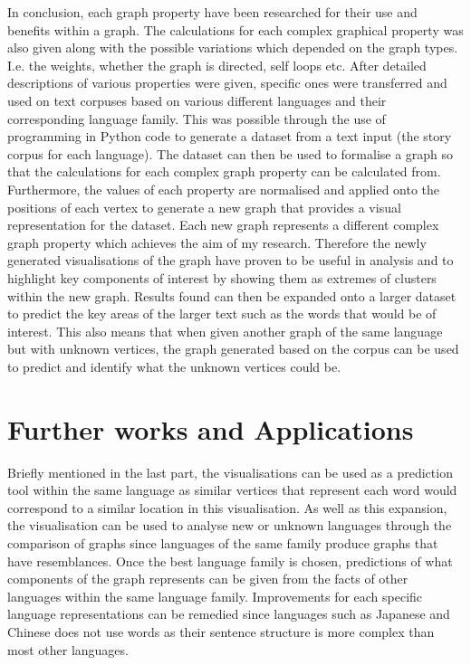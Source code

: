 \noindent In conclusion, each graph property have been researched for their use and benefits within a graph. The calculations for each complex graphical property was also given along with the possible variations which depended on the graph types. I.e. the weights, whether the graph is directed, self loops etc. After detailed descriptions of various properties were given, specific ones were transferred and used on text corpuses based on various different languages and their corresponding language family. This was possible through the use of programming in Python code to generate a dataset from a text input (the story corpus for each language). The dataset can then be used to formalise a graph so that the calculations for each complex graph property can be calculated from. Furthermore, the values of each property are normalised and applied onto the positions of each vertex to generate a new graph that provides a visual representation for the dataset. Each new graph represents a different complex graph property which achieves the aim of my research. Therefore the newly generated visualisations of the graph have proven to be useful in analysis and to highlight key components of interest by showing them as extremes of clusters within the new graph. Results found can then be expanded onto a larger dataset to predict the key areas of the larger text such as the words that would be of interest. This also means that when given another graph of the same language but with unknown vertices, the graph generated based on the corpus can be used to predict and identify what the unknown vertices could be. 

\section{Further works and Applications}
Briefly mentioned in the last part, the visualisations can be used as a prediction tool within the same language as similar vertices that represent each word would correspond to a similar location in this visualisation. As well as this expansion, the visualisation can be used to analyse new or unknown languages through the comparison of graphs since languages of the same family produce graphs that have resemblances. Once the best language family is chosen, predictions of what components of the graph represents can be given from the facts of other languages within the same language family. Improvements for each specific language representations can be remedied since languages such as Japanese and Chinese does not use words as their sentence structure is more complex than most other languages.

